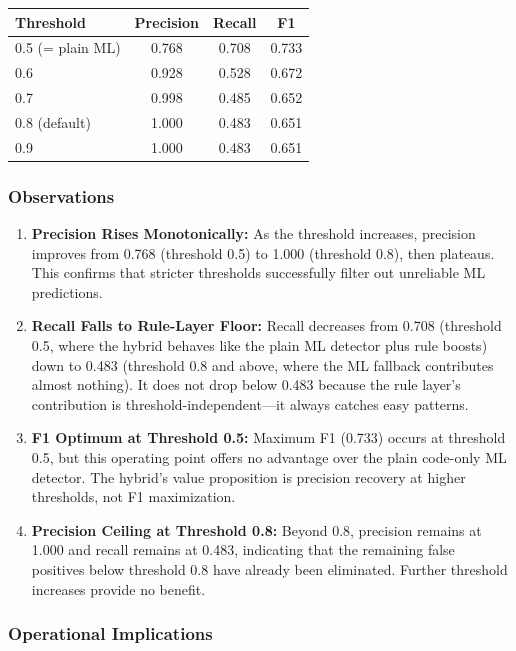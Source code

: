 \begin{center}
\begin{tabular}{lccc}
\hline
Threshold & Precision & Recall & F1 \\
\hline
0.5 (= plain ML) & 0.768 & 0.708 & 0.733 \\
0.6 & 0.928 & 0.528 & 0.672 \\
0.7 & 0.998 & 0.485 & 0.652 \\
0.8 (default) & 1.000 & 0.483 & 0.651 \\
0.9 & 1.000 & 0.483 & 0.651 \\
\hline
\end{tabular}
\end{center}

\subsubsection{Observations}

\begin{enumerate}
  \item \textbf{Precision Rises Monotonically:} As the threshold increases, precision improves from 0.768 (threshold 0.5) to 1.000 (threshold 0.8), then plateaus. This confirms that stricter thresholds successfully filter out unreliable ML predictions.
  
  \item \textbf{Recall Falls to Rule-Layer Floor:} Recall decreases from 0.708 (threshold 0.5, where the hybrid behaves like the plain ML detector plus rule boosts) down to 0.483 (threshold 0.8 and above, where the ML fallback contributes almost nothing). It does not drop below 0.483 because the rule layer's contribution is threshold-independent—it always catches easy patterns.
  
  \item \textbf{F1 Optimum at Threshold 0.5:} Maximum F1 (0.733) occurs at threshold 0.5, but this operating point offers no advantage over the plain code-only ML detector. The hybrid's value proposition is precision recovery at higher thresholds, not F1 maximization.
  
  \item \textbf{Precision Ceiling at Threshold 0.8:} Beyond 0.8, precision remains at 1.000 and recall remains at 0.483, indicating that the remaining false positives below threshold 0.8 have already been eliminated. Further threshold increases provide no benefit.
\end{enumerate}

\subsubsection{Operational Implications}

